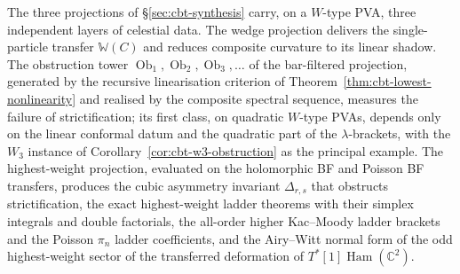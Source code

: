 The three projections of \S\ref{sec:cbt-synthesis} carry, on a
$W$-type PVA, three independent layers of celestial data. The wedge
projection delivers the single-particle transfer
$\mathbb{W}(C)$ and reduces composite curvature to its linear
shadow. The obstruction tower
$\operatorname{Ob}_1,\operatorname{Ob}_2,\operatorname{Ob}_3,\ldots$
of the bar-filtered projection, generated by the recursive
linearisation criterion of
Theorem~\ref{thm:cbt-lowest-nonlinearity} and realised by the
composite spectral sequence, measures the failure of strictification;
its first class, on quadratic $W$-type PVAs, depends only on the
linear conformal datum and the quadratic part of the
$\lambda$-brackets, with the $W_3$ instance of
Corollary~\ref{cor:cbt-w3-obstruction} as the principal example. The
highest-weight projection, evaluated on the holomorphic BF and
Poisson BF transfers, produces the cubic asymmetry invariant
$\Delta_{r,s}$ that obstructs strictification, the exact
highest-weight ladder theorems with their simplex integrals and
double factorials, the all-order higher Kac--Moody ladder brackets
and the Poisson $\pi_n$ ladder coefficients, and the Airy--Witt
normal form of the odd highest-weight sector of the transferred
deformation of $T^*[1]\operatorname{Ham}(\mathbb{C}^2)$.
